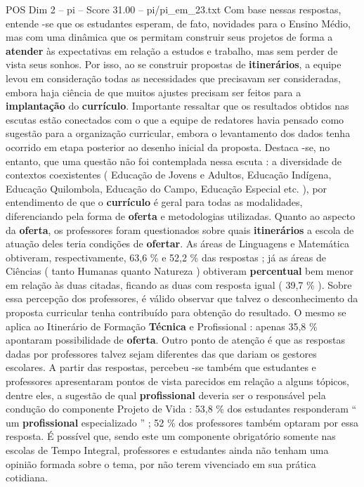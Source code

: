 \begin{textsample}{POS Dim 2 – pi – Score 31.00 – pi/pi\_em\_23.txt}
Com base nessas respostas, entende -se que os estudantes esperam, de fato, novidades para o Ensino Médio, mas com uma dinâmica que os permitam construir seus projetos de forma a \textbf{atender} às expectativas em relação a estudos e trabalho, mas sem perder de vista seus sonhos.
Por isso, ao se construir propostas de \textbf{itinerários}, a equipe levou em consideração todas as necessidades que precisavam ser consideradas, embora haja ciência de que muitos ajustes precisam ser feitos para a \textbf{implantação} do \textbf{currículo}.
Importante ressaltar que os resultados obtidos nas escutas estão conectados com o que a equipe de redatores havia pensado como sugestão para a organização curricular, embora o levantamento dos dados tenha ocorrido em etapa posterior ao desenho inicial da proposta.
Destaca -se, no entanto, que uma questão não foi contemplada nessa escuta : a diversidade de contextos coexistentes ( Educação de Jovens e Adultos, Educação Indígena, Educação Quilombola, Educação do Campo, Educação Especial etc. ), por entendimento de que o \textbf{currículo} é geral para todas as modalidades, diferenciando pela forma de \textbf{oferta} e metodologias utilizadas.
Quanto ao aspecto da \textbf{oferta}, os professores foram questionados sobre quais \textbf{itinerários} a escola de atuação deles teria condições de \textbf{ofertar}.
As áreas de Linguagens e Matemática obtiveram, respectivamente, 63,6 \% e 52,2 \% das respostas ; já as áreas de Ciências ( tanto Humanas quanto Natureza ) obtiveram \textbf{percentual} bem menor em relação às duas citadas, ficando as duas com resposta igual ( 39,7 \% ).
Sobre essa percepção dos professores, é válido observar que talvez o desconhecimento da proposta curricular tenha contribuído para obtenção do resultado.
O mesmo se aplica ao Itinerário de Formação \textbf{Técnica} e Profissional : apenas 35,8 \% apontaram possibilidade de \textbf{oferta}.
Outro ponto de atenção é que as respostas dadas por professores talvez sejam diferentes das que dariam os gestores escolares.
A partir das respostas, percebeu -se também que estudantes e professores apresentaram pontos de vista parecidos em relação a alguns tópicos, dentre eles, a sugestão de qual \textbf{profissional} deveria ser o responsável pela condução do componente Projeto de Vida : 53,8 \% dos estudantes responderam “ um \textbf{profissional} especializado ” ; 52 \% dos professores também optaram por essa resposta.
É possível que, sendo este um componente obrigatório somente nas escolas de Tempo Integral, professores e estudantes ainda não tenham uma opinião formada sobre o tema, por não terem vivenciado em sua prática cotidiana.

\end{textsample}
